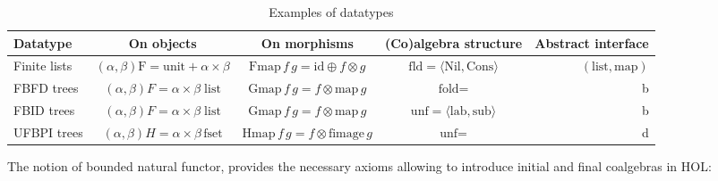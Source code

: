\begin{table}[h]
	\begin{adjustwidth}{-2.5cm}{}
		\begin{center}
			\begin{tabular}{ | l | c | c | c | r | }
				\hline
				Datatype & On objects & On morphisms & (Co)algebra structure & Abstract interface \\ \hline
				Finite lists & $(\alpha,\beta) \text{F} = \text{unit} + \alpha \times \beta$ & $\text{Fmap} \, f \, g = \text{id} \oplus f \otimes g$ & $\text{fld} = \langle \text{Nil}, \text{Cons} \rangle$ & $(\text{list},\text{map})$  \\ 
				FBFD trees & $(\alpha,\beta)F = \alpha \times \beta \; \text{list}$ & $\text{Gmap} \, f \, g = f \otimes \text{map} \, g$ & $\text{fold} = $ & b \\
				FBID trees & $(\alpha,\beta)F = \alpha \times \beta \; \text{list}$ & $\text{Gmap} \, f \, g = f \otimes \text{map} \, g$ & $\text{unf} = \langle \text{lab}, \text{sub} \rangle$ & b \\
				UFBPI trees & $(\alpha,\beta)H = \alpha \times \beta \, \text{fset}$ & $\text{Hmap} \, f \, g = f \otimes \text{fimage} \, g$ & $\text{unf} =$ & d \\
				\hline
			\end{tabular}
		\end{center}
	\end{adjustwidth}
	\caption{Examples of datatypes}
	\label{table:1}
\end{table}

The notion of bounded natural functor, provides the necessary axioms allowing to introduce initial and final coalgebras in HOL:

